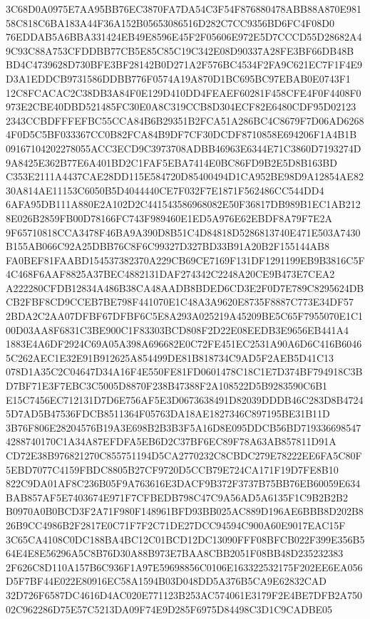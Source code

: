 \documentclass[UTF8,fontset=fandol,zihao=-4,a4paper]{ctexart}
\begin{document}
{{3C68D0A0975E7AA95BB76EC3870FA7DA54C3F54F876880478ABB88A870E98158C818C6BA183A44F36A152B05653086516D282C7CC9356BD6FC4F08D0
76EDDAB5A6BBA331424EB49E8596E45F2F05606E972E5D7CCCD55D28682A49C93C88A753CFDDBB77CB5E85C85C19C342E08D90337A28FE3BF66DB48B
BD4C4739628D730BFE3BF28142B0D271A2F576BC4534F2FA9C621EC7F1F4E9D3A1EDDCB9731586DDBB776F0574A19A870D1BC695BC97EBAB0E0743F1
12C8FCACAC2C38DB3A84F0E129D410DD4FEAEF60281F458CFE4F0F4408F0973E2CBE40DBD521485FC30E0A8C319CCB8D304ECF82E6480CDF95D02123
2343CCBDFFFEFBC55CCA84B6B29351B2FCA51A286BC4C8679F7D06AD62684F0D5C5BF033367CC0B82FCA84B9DF7CF30DCDF8710858E694206F1A4B1B
09167104202278055ACC3ECD9C3973708ADBB46963E6344E71C3860D7193274D9A8425E362B77E6A401BD2C1FAF5EBA7414E0BC86FD9B2E5D8B163BD
C353E2111A4437CAE28DD115E584720D85400494D1CA952BE98D9A12854AE8230A814AE11153C6050B5D4044440CE7F032F7E1871F562486CC544DD4
6AFA95DB111A880E2A102D2C441543586968082E50F36817DB989B1EC1AB2128E026B2859FB00D78166FC743F989460E1ED5A976E62EBDF8A79F7E2A
9F65710818CCA3478F46BA9A390D8B51C4D84818D5286813740E471E503A7430B155AB066C92A25DBB76C8F6C99327D327BD33B91A20B2F155144AB8
FA0BEF81FAABD154537382370A229CB69CE7169F131DF1291199EB9B3816C5F4C468F6AAF8825A37BEC4882131DAF274342C2248A20CE9B473E7CEA2
A222280CFDB12834A486B38CA48AADB8BDED6CD3E2F0D7E789C8295624DBCB2FBF8CD9CCEB7BE798F441070E1C48A3A9620E8735F8887C773E34DF57
2BDA2C2AA07DFBF67DFBF6C5E8A293A025219A45209BE5C65F7955070E1C100D03AA8F6831C3BE900C1F83303BCD808F2D22E08EEDB3E9656EB441A4
1883E4A6DF2924C69A05A398A696682E0C72FE451EC2531A90A6D6C416B60465C262AEC1E32E91B912625A854499DE81B818734C9AD5F2AEB5D41C13
078D1A35C2C04647D34A16F4E550FE81FD0601478C18C1E7D374BF794918C3BD7BF71E3F7EBC3C5005D8870F238B47388F2A108522D5B9283590C6B1
E15C7456EC712131D7D6E756AF5E3D0673638491D82039DDDB46C283D8B47245D7AD5B47536FDCB8511364F05763DA18AE1827346C897195BE31B11D
3B76F806E28204576B19A3E698B2B3B3F5A16D8E095DDCB56BD7193366985474288740170C1A34A87EFDFA5EB6D2C37BF6EC89F78A63AB857811D91A
CD72E38B976821270C855751194D5CA2770232C8CBDC279E78222EE6FA5C80F5EBD7077C4159FBDC8805B27CF9720D5CCB79E724CA171F19D7FE8B10
822C9DA01AF8C236B05F9A763616E3DACF9B372F3737B75BB76EB60059E634BAB857AF5E7403674E971F7CFBEDB798C47C9A56AD5A6135F1C9B2B2B2
B0970A0B0BCD3F2A71F980F148961BFD93BB025AC889D196AE6BBB8D202B826B9CC4986B2F2817E0C71F7F2C71DE27DCC94594C900A60E9017EAC15F
3C65CA4108C0DC188BA4BC12C01BCD12DC13090FFF08BFCB022F399E356B564E4E8E56296A5C8B76D30A88B973E7BAA8CBB2051F08BB48D235232383
2F626C8D110A157B6C936F1A97E59698856C0106E163322532175F202EE6EA056D5F7BF44E022E80916EC58A1594B03D048DD5A376B5CA9E62832CAD
32D726F6587DC4616D4AC020E771123B253AC574061E3179F2E4BE7DFB2A75002C962286D75E57C5213DA09F74E9D285F6975D84498C3D1C9CADBE05
}}
\end{document}
